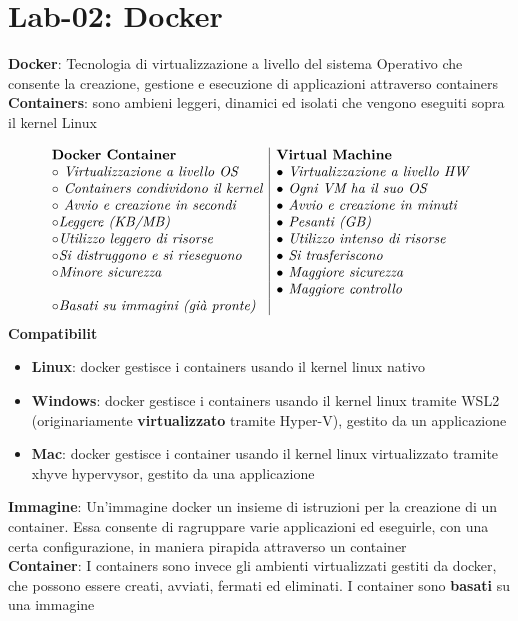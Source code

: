 \section{Lab-02: Docker}
\begin{flushleft}
  \textbf{Docker}: Tecnologia di virtualizzazione a livello del sistema Operativo che 
  consente la creazione, gestione e esecuzione di applicazioni attraverso containers \\
  \textbf{Containers}: sono ambieni leggeri, dinamici ed isolati che vengono eseguiti sopra 
  il kernel Linux\par 
  $$\begin{array}{l|l}
    \textbf{Docker Container} & \textbf{Virtual Machine} \\
    \circ \textit{ Virtualizzazione a livello OS} & \bullet \textit{ Virtualizzazione a livello HW}\\ 
    \circ \textit{ Containers condividono il kernel} & \bullet \textit{ Ogni VM ha il suo OS}\\
    \circ \textit{ Avvio e creazione in secondi } & \bullet \textit{ Avvio e creazione in minuti}\\
    \circ \textit{Leggere (KB/MB)} & \bullet \textit{ Pesanti (GB)}\\
    \circ \textit{Utilizzo leggero di risorse} & \bullet \textit{ Utilizzo intenso di risorse}\\
    \circ \textit{Si distruggono e si rieseguono} & \bullet \textit{ Si trasferiscono}\\ 
    \circ \textit{Minore sicurezza} & \bullet \textit{ Maggiore sicurezza}\\
    & \bullet \textit{ Maggiore controllo} \\
    \circ \textit{Basati su immagini (gi\`a pronte)} & \\
  \end{array}$$
  \textbf{Compatibilit\aca}
  \begin{itemize}
    \item \textbf{Linux}: docker gestisce i containers usando il kernel linux nativo
    \item \textbf{Windows}: docker gestisce i containers usando il kernel linux tramite WSL2
            (originariamente \textbf{virtualizzato} tramite Hyper-V), gestito da un applicazione
    \item \textbf{Mac}: docker gestisce i container usando il kernel linux virtualizzato tramite xhyve hypervysor, 
          gestito da una applicazione
  \end{itemize}
  \textbf{Immagine}: Un'immagine docker \ace un insieme di istruzioni per la creazione di un 
  container. Essa consente di ragruppare varie applicazioni ed eseguirle, con una certa configurazione, 
  in maniera pi\acu rapida attraverso un container \\ 
  \textbf{Container}: I containers sono invece gli ambienti virtualizzati gestiti da docker, che possono essere creati, 
  avviati, fermati ed eliminati. I container sono \textbf{basati} su una immagine
\end{flushleft}
